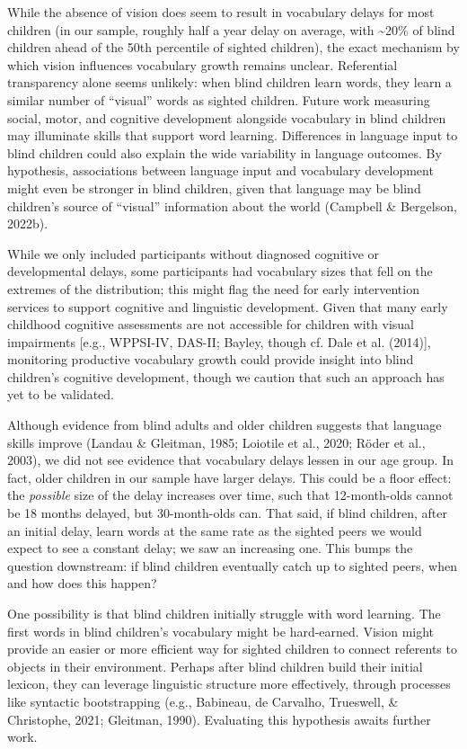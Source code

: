 \documentclass[
  man,floatsintext]{apa6}
\begin{document}
While the absence of vision does seem to result in vocabulary delays for most children (in our sample, roughly half a year delay on average, with \textasciitilde20\% of blind children ahead of the 50th percentile of sighted children), the exact mechanism by which vision influences vocabulary growth remains unclear. Referential transparency alone seems unlikely: when blind children learn words, they learn a similar number of ``visual'' words as sighted children. Future work measuring social, motor, and cognitive development alongside vocabulary in blind children may illuminate skills that support word learning. Differences in language input to blind children could also explain the wide variability in language outcomes. By hypothesis, associations between language input and vocabulary development might even be stronger in blind children, given that language may be blind children's source of ``visual'' information about the world (Campbell \& Bergelson, 2022b).

While we only included participants without diagnosed cognitive or developmental delays, some participants had vocabulary sizes that fell on the extremes of the distribution; this might flag the need for early intervention services to support cognitive and linguistic development. Given that many early childhood cognitive assessments are not accessible for children with visual impairments {[}e.g., WPPSI-IV, DAS-II; Bayley, though cf. Dale et al. (2014){]}, monitoring productive vocabulary growth could provide insight into blind children's cognitive development, though we caution that such an approach has yet to be validated.

Although evidence from blind adults and older children suggests that language skills improve (Landau \& Gleitman, 1985; Loiotile et al., 2020; Röder et al., 2003), we did not see evidence that vocabulary delays lessen in our age group. In fact, older children in our sample have larger delays. This could be a floor effect: the \emph{possible} size of the delay increases over time, such that 12-month-olds cannot be 18 months delayed, but 30-month-olds can. That said, if blind children, after an initial delay, learn words at the same rate as the sighted peers we would expect to see a constant delay; we saw an increasing one. This bumps the question downstream: if blind children eventually catch up to sighted peers, when and how does this happen?

One possibility is that blind children initially struggle with word learning. The first words in blind children's vocabulary might be hard-earned. Vision might provide an easier or more efficient way for sighted children to connect referents to objects in their environment. Perhaps after blind children build their initial lexicon, they can leverage linguistic structure more effectively, through processes like syntactic bootstrapping (e.g., Babineau, de Carvalho, Trueswell, \& Christophe, 2021; Gleitman, 1990). Evaluating this hypothesis awaits further work.
\end{document}
